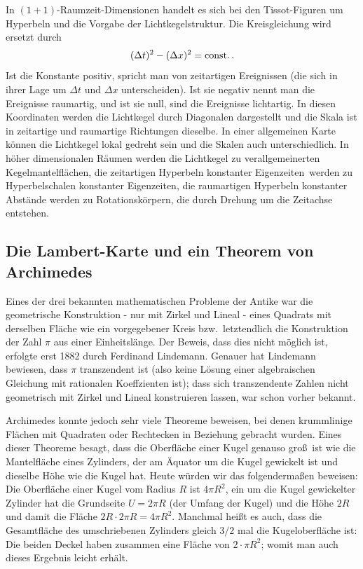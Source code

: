In $(1+1)$-Raumzeit-Dimensionen handelt es sich bei den Tissot-Figuren um Hyperbeln und
die Vorgabe der Lichtkegelstruktur. 
Die Kreisgleichung wird ersetzt durch
\begin{equation}
                          (\Delta t)^2 - (\Delta x)^2 = {\rm const.}   \, .
\end{equation} 
Ist die Konstante positiv, spricht man von 
zeitartigen Ereignissen (die sich in ihrer
Lage um $\Delta t$ und $\Delta x$ unterscheiden). Ist sie negativ nennt man die Ereignisse
raumartig, und ist sie null, sind die Ereignisse lichtartig. 
In diesen Koordinaten werden die
Lichtkegel durch Diagonalen dargestellt und die Skala ist in zeitartige und raumartige Richtungen
dieselbe. In einer allgemeinen Karte k\"onnen die Lichtkegel lokal gedreht sein und die Skalen
auch unterschiedlich. In h\"oher dimensionalen R\"aumen werden die Lichtkegel zu verallgemeinerten
Kegelmantelfl\"achen, die zeitartigen \glqq Hyperbeln konstanter Eigenzeiten\grqq\ werden zu
 \glqq Hyperbelschalen konstanter Eigenzeiten\grqq, die raumartigen Hyperbeln konstanter Abst\"ande
 werden zu Rotationsk\"orpern, die durch Drehung um die Zeitachse entstehen.

\subsection{Die Lambert-Karte und ein Theorem von Archimedes}

Eines der drei bekannten mathematischen Probleme der Antike war die geometrische Konstruktion -
nur mit Zirkel und Lineal - eines Quadrats mit derselben Fl\"ache wie ein vorgegebener Kreis
bzw.\ letztendlich die Konstruktion der Zahl $\pi$ aus einer Einheitsl\"ange. Der Beweis, dass
dies nicht m\"oglich ist, erfolgte erst 1882 durch 
Ferdinand Lindemann. Genauer hat Lindemann
bewiesen, dass $\pi$ trans\-zendent ist (also keine L\"osung einer algebraischen Gleichung mit rationalen
Koeffzienten ist); dass sich transzendente Zahlen nicht geometrisch mit Zirkel und Lineal
konstruieren lassen, war schon vorher bekannt. 

Archimedes 
konnte jedoch sehr viele Theoreme beweisen, bei denen krummlinige Fl\"achen
mit Quadraten oder Rechtecken in Beziehung gebracht wurden. Eines dieser Theoreme
besagt, dass die Oberfl\"ache einer Kugel genauso gro\ss\ ist wie die Mantelfl\"ache eines
Zylinders, der am \"Aquator um die Kugel gewickelt ist und dieselbe H\"ohe wie die Kugel hat. 
Heute w\"urden wir das folgenderma\ss en beweisen: Die Oberfl\"ache einer Kugel vom Radius $R$
ist $4\pi R^2$, ein um die Kugel gewickelter Zylinder hat die Grundseite $U=2\pi R$ (der Umfang
der Kugel) und die H\"ohe $2R$ und damit die Fl\"ache $2R\cdot 2\pi R = 4\pi R^2$. Manchmal
hei\ss t es auch, dass die Gesamtfl\"ache des umschriebenen Zylinders gleich $3/2$ mal
die Kugeloberfl\"ache ist: Die beiden Deckel haben zusammen eine Fl\"ache von $2 \cdot \pi R^2$; womit
man auch dieses Ergebnis leicht erh\"alt.   

